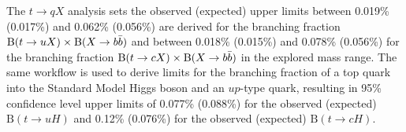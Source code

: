 The $t\to qX$ analysis sets the observed (expected) upper limits between 0.019\% (0.017\%) and 0.062\% (0.056\%) are derived for the branching fraction $\text{B}(t\to uX)\times\text{B}(X\to b\bar{b})$ and between 0.018\% (0.015\%) and 0.078\% (0.056\%) for the branching fraction $\text{B}(t\to cX)\times\text{B}(X\to b\bar{b})$ in the explored mass range. The same workflow is  used to derive limits for the branching fraction of a top quark into the Standard Model Higgs boson and an $up$-type quark, resulting in 95\% confidence level upper limits of 0.077\% (0.088\%) for the observed (expected) $\text{B}(t\to uH)$ and 0.12\% (0.076\%) for the observed (expected) $\text{B}(t\to cH)$.




